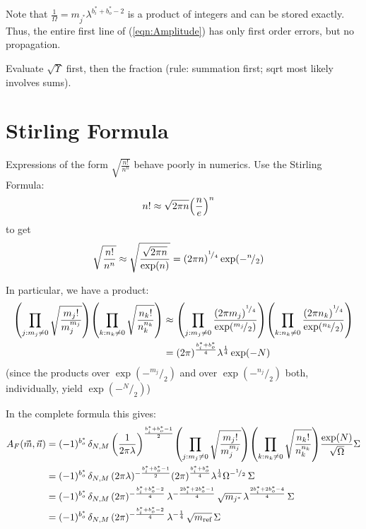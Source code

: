 \documentclass[
	english,
	a4paper,
	fontsize=10pt,
	parskip=half,
	titlepage=true,
	DIV=12,
	final
]{scrreprt}
\newcommand*{\smallfrac}  [2]{\ensuremath{{}^        {#1} \!/_        {#2}}}
\begin{document}
Note that $\frac{1}{\Omega} = m_{j^*} \lambda^{b_i^* + b_o^* - 2} $ is a product of integers and can be stored exactly. Thus, the entire first line of (\ref{eqn:Amplitude}) has only first order errors, but no propagation.

Evaluate $\sqrt{\Upsilon}$ first, then the fraction (rule: summation first; sqrt most likely involves sums).



\chapter{Stirling Formula}
Expressions of the form $\sqrt{\frac{n!}{n^n}}$ behave poorly in numerics. Use the Stirling Formula:
\begin{align}
	n! 
&\approx
	\sqrt{2\pi n}
	\qty(\frac{n}{e})^n
\end{align}
to get
\begin{align}
	\sqrt{\frac{n!}{n^n}}
&\approx
	\sqrt{
		\frac
			{\sqrt{2\pi n}}
			{\exp(n)}
	}
=
	\qty(2\pi n)^{\smallfrac{1}{4}}
	\exp(-\smallfrac{n}{2})
\end{align}

In particular, we have a product:
\begin{align}
	\qty( \prod_{j : m_j \neq 0}
		\sqrt{\frac
			{ m_j! }
			{ m_j^{m_j} }
	})
	\qty( \prod_{k : n_k \neq 0}
		\sqrt{\frac
			{ n_k! }
			{ n_k^{n_k} }
	})
&\approx
	\qty( \prod_{j : m_j \neq 0} \frac
		{\qty(2\pi m_j)^{\smallfrac{1}{4}}}
		{\exp(\smallfrac{m_j}{2})}
	)
	\qty( \prod_{k : n_k \neq 0} \frac
		{\qty(2\pi n_k)^{\smallfrac{1}{4}}}
		{\exp(\smallfrac{n_k}{2})}
	) \\
&=
	(2\pi)^{\frac{b^*_i + b^*_o}{4}}
	\lambda^{\frac{1}{4}}
	\exp(-N)
\end{align}
(since the products over $\exp(-\smallfrac{m_j}{2})$ and over $\exp(-\smallfrac{n_j}{2})$ both, individually, yield $\exp(-\smallfrac{N}{2})$)

In the complete formula this gives:
\begin{align}
	A_F(\vec{m}, \vec{n})
&=
	(-1)^{b_o^*} \,
	\delta_{N,M} \, \qty(
		\frac{1}{2\pi\lambda}
	)^{\frac{b_i^* + b_o^* - 1}{2}}
	\qty( \prod_{j : m_j \neq 0}
		\sqrt{\frac
			{ m_j! }
			{ m_j^{m_j} }
	})
	\qty( \prod_{k : n_k \neq 0}
		\sqrt{\frac
			{ n_k! }
			{ n_k^{n_k} }
	})
	\frac
		{\exp(N)}
		{\sqrt{\Omega}}
	\Sigma \\
&=
	(-1)^{b_o^*} \,
	\delta_{N,M} \, 
	(2\pi\lambda)^{-\frac{b_i^* + b_o^* - 1}{2}}
	(2\pi)^{\frac{b^*_i + b^*_o}{4}}
	\lambda^{\frac{1}{4}}
	\Omega^{-\smallfrac{1}{2}} \,
	\Sigma \\
&=
	(-1)^{b_o^*} \,
	\delta_{N,M} \,
	(2\pi)          ^{-\frac{ b_i^* +  b_o^* - 2}{4}} \,
	\lambda         ^{-\frac{2b_i^* + 2b_o^* - 1}{4}} \,
	\sqrt{m_{j^*}} \,
	\lambda^{ \frac{2b_i^* + 2b_o^* - 4}{4}} \,
	\Sigma
	\\
&=
	(-1)^{b_o^*} \,
	\delta_{N,M} \,
	(2\pi)^{ -\frac{b_i^* + b_o^* - 2}{4}} \,
	\lambda^{-\frac{1}{4}} \,
	\sqrt{m_{\text{ref}}} \,
	\Sigma
\end{align}

\end{document}
